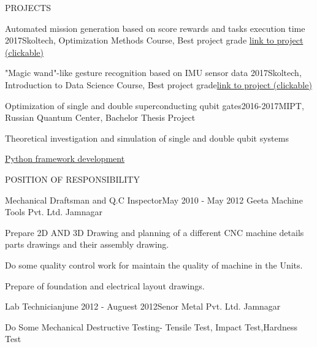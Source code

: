\documentclass{resume} %
\begin{document}
\begin{rSection}{PROJECTS}
\begin{rSubsection}{Automated mission generation based on score rewards and tasks execution time
}{2017}{Skoltech, Optimization Methods Course, Best project grade}{ \href{https://github.com/safoex/OptimizationMethods/blob/master/Project/Project\_s.ipynb}{link to project  (clickable)}
}
\end{rSubsection}

\begin{rSubsection}{"Magic wand"-like gesture recognition based on IMU sensor data }{2017}{Skoltech, Introduction to Data Science Course,  Best project grade}{\href{https://github.com/MisterMap/MagicWand/blob/master/Gesture\%20classification\%20Presentation.ipynb}{link to project  (clickable)}}

\end{rSubsection}

\begin{rSubsection}{Optimization of single and double superconducting qubit gates}{2016-2017}{MIPT, Russian Quantum Center, Bachelor Thesis Project}{}
\item Theoretical investigation and simulation of single and double qubit systems
\item \href{https://github.com/safoex/qubitlab}{Python framework development}
\end{rSubsection}



\end{rSection} 


\iffalse

\begin{rSection}{POSITION OF RESPONSIBILITY}

\begin{rSubsection}{Mechanical Draftsman and Q.C Inspector}{May 2010 - May 2012} {Geeta Machine Tools Pvt. Ltd. Jamnagar} {} 
\item Prepare 2D AND 3D Drawing and planning of a different CNC machine details
parts drawings and their assembly drawing.
\item Do some quality control work for maintain the quality of machine in the Units.
\item Prepare of foundation and electrical layout drawings.
\end{rSubsection}



\begin{rSubsection}{Lab Technician}{june 2012 - Auguest 2012}{Senor Metal Pvt. Ltd. Jamnagar} {}
 \item Do Some Mechanical Destructive Testing- Tensile Test, Impact Test,Hardness Test
\end{rSubsection}
 
\end{rSection}
\end{document}
